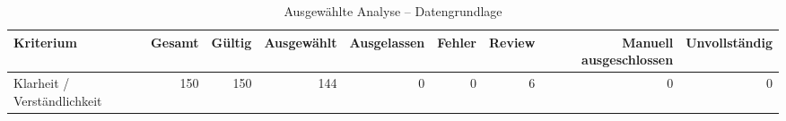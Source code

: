 \begin{table}[htbp]
\centering
\caption{Ausgewählte Analyse -- Datengrundlage}
\begin{tabular}{lrrrrrrrr}
\toprule
Kriterium & Gesamt & Gültig & Ausgewählt & Ausgelassen & Fehler & Review & Manuell ausgeschlossen & Unvollständig \\
\midrule
Klarheit / Verständlichkeit & 150 & 150 & 144 & 0 & 0 & 6 & 0 & 0 \\
\bottomrule
\end{tabular}
\end{table}
